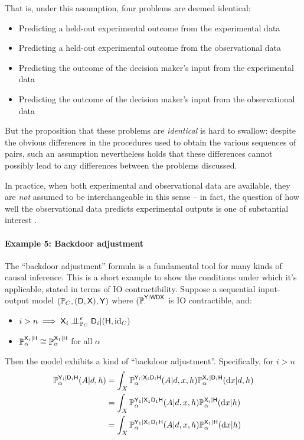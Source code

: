 That is, under this assumption, four problems are deemed identical:
\begin{itemize}
    \item Predicting a held-out experimental outcome from the experimental data
    \item Predicting a held-out experimental outcome from the observational data
    \item Predicting the outcome of the decision maker's input from the experimental data
    \item Predicting the outcome of the decision maker's input from the observational data
\end{itemize}

But the proposition that these problems are \emph{identical} is hard to swallow: despite the obvious differences in the procedures used to obtain the various sequences of pairs, such an assumption nevertheless holds that these differences cannot possibly lead to any differences between the problems discussed.

In practice, when both experimental and observational data are available, they are \emph{not} assumed to be interchangeable in this sense -- in fact, the question of how well the observational data predicts experimental outputs is one of substantial interest \citet{eckles_bias_2021,gordon_comparison_2018,gordon_close_2022}.

\paragraph{Example 5: Backdoor adjustment}

The ``backdoor adjustment'' formula is a fundamental tool for many kinds of causal inference. This is a short example to show the conditions under which it's applicable, stated in terms of IO contractibility. Suppose a sequential input-output model $(\mathbb{P}_C,(\mathsf{D},\mathsf{X}),\mathsf{Y})$ where $(\mathbb{P}_\cdot^{\mathsf{Y}|\mathsf{WDX}}$ is IO contractible, and:
\begin{itemize}
    \item $i>n\implies \RV{X}_{i}\CI^e_{\prob{P}_C}\RV{D}_{i}|(\RV{H},\text{id}_C)$
    \item $\mathbb{P}_\alpha^{\mathsf{X}_{i}|\mathsf{H}}\cong \mathbb{P}_\alpha^{\mathsf{X}_{1}|\mathsf{H}}$ for all $\alpha$
 \end{itemize}
Then the model exhibits a kind of ``backdoor adjustment''. Specifically, for $i>n$
\begin{align}
    \mathbb{P}_\alpha^{\mathsf{Y}_{i}|\mathsf{D}_{i}\mathsf{H}}(A|d,h) &= \int_X \mathbb{P}_\alpha^{\mathsf{Y}_{i}|\mathsf{X}_{i}\mathsf{D}_{i}\mathsf{H}}(A|d,x,h)\mathbb{P}_\alpha^{\mathsf{X}_{i}|\mathsf{D}_{i}\mathsf{H}}(\mathrm{d}x|d,h)\\
    &= \int_X \mathbb{P}_\alpha^{\mathsf{Y}_{1}|\mathsf{X}_{1}\mathsf{D}_{1}\mathsf{H}}(A|d,x,h)\mathbb{P}_\alpha^{\mathsf{X}_{i}|\mathsf{H}}(\mathrm{d}x|h)\\
    &= \int_X \mathbb{P}_\alpha^{\mathsf{Y}_{1}|\mathsf{X}_{1}\mathsf{D}_{1}\mathsf{H}}(A|d,x,h)\mathbb{P}_\alpha^{\mathsf{X}_{1}|\mathsf{H}}(\mathrm{d}x|h)\label{eq:backdoor}
\end{align}

